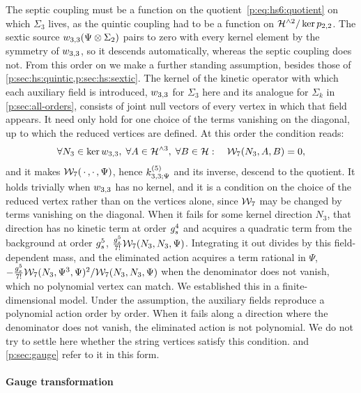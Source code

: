 The septic coupling must be a function on the quotient~\eqref{p:eq:hs6:quotient} on which $\Sigma_3$ lives, as the quintic coupling had to be a function on $\mathcal{H}^{\wedge 2} / \ker p_{2,2}$.
The sextic source $w_{3,3}(\Psi \otimes \Sigma_2)$ pairs to zero with every kernel element by the symmetry of $w_{3,3}$, so it descends automatically, whereas the septic coupling does not.
From this order on we make a further standing assumption, besides those of \cref{p:sec:hs:quintic,p:sec:hs:sextic}.
The kernel of the kinetic operator with which each auxiliary field is introduced, $w_{3,3}$ for $\Sigma_3$ here and its analogue for $\Sigma_k$ in \cref{p:sec:all-orders}, consists of joint null vectors of every vertex in which that field appears.
It need only hold for one choice of the terms vanishing on the diagonal, up to which the reduced vertices are defined.
At this order the condition reads:
\begin{equation}
  \label{p:eq:hs7:kernel-condition}
  \forall N_3 \in \ker w_{3,3}, \;
  \forall A \in \mathcal{H}^{\wedge 3}, \;
  \forall B \in \mathcal{H}:
  \quad
  \mathcal{W}_{7}(N_3, A, B)
    = 0,
\end{equation}
and it makes $\mathcal{W}_{7}(\, \cdot \,, \cdot \,, \Psi)$, hence $\kin{3}{\Psi}{5}$ and its inverse, descend to the quotient.
It holds trivially when $w_{3,3}$ has no kernel, and it is a condition on the choice of the reduced vertex rather than on the vertices alone, since $\mathcal{W}_{7}$ may be changed by terms vanishing on the diagonal.
When it fails for some kernel direction $N_3$, that direction has no kinetic term at order $g_s^4$ and acquires a quadratic term from the background at order $g_s^5$, $\tfrac{g_s^5}{7!} \mathcal{W}_{7}(N_3, N_3, \Psi)$.
Integrating it out divides by this field-dependent mass, and the eliminated action acquires a term rational in $\Psi$, $- \tfrac{g_s^5}{7!} \mathcal{W}_{7}(N_3, \Psi^3, \Psi)^2 / \mathcal{W}_{7}(N_3, N_3, \Psi)$ when the denominator does not vanish, which no polynomial vertex can match.
We established this in a finite-dimensional model.
Under the assumption, the auxiliary fields reproduce a polynomial action order by order.
When it fails along a direction where the denominator does not vanish, the eliminated action is not polynomial.
We do not try to settle here whether the string vertices satisfy this condition.
 and \cref{p:sec:gauge} refer to it in this form.

\paragraph{Gauge transformation}
\label{p:sec:hs:septic:gauge}

